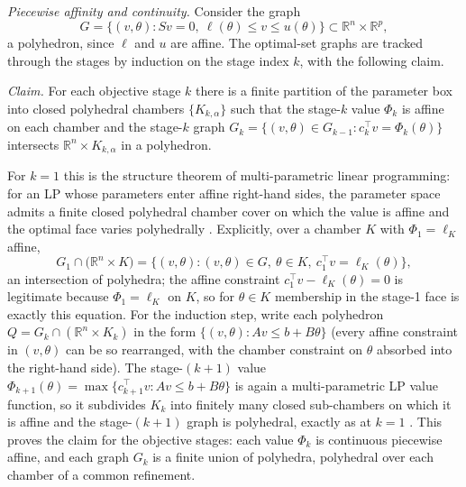 \documentclass[11pt,a4paper]{article}
\theoremstyle{plain}
\theoremstyle{definition}
\theoremstyle{remark}
\newcommand{\RR}{\mathbb{R}}
\begin{document}
\emph{Piecewise affinity and continuity.} Consider the graph
\[
G = \bigl\{(v, \theta) : Sv = 0,\ \ell(\theta) \le v \le u(\theta)
\bigr\} \subset \RR^{n} \times \RR^{p},
\]
a polyhedron, since $\ell$ and $u$ are affine. The optimal-set
graphs are tracked through the stages by induction on the stage
index $k$, with the following claim.

\emph{Claim.} For each objective stage $k$ there is a finite
partition of the parameter box into closed polyhedral chambers
$\{K_{k,\alpha}\}$ such that the stage-$k$ value $\Phi_k$ is affine
on each chamber and the stage-$k$ graph $G_k = \{(v,\theta) \in
G_{k-1} : c_k^{\top}v = \Phi_k(\theta)\}$ intersects
$\RR^{n} \times K_{k,\alpha}$ in a polyhedron.

For $k = 1$ this is the structure theorem of multi-parametric
linear programming: for an LP whose parameters enter affine
right-hand sides, the parameter space admits a finite closed
polyhedral chamber cover on which the value is affine and the
optimal face varies polyhedrally \citep{borrelli2003}. Explicitly,
over a chamber $K$ with $\Phi_1 = \ell_K$ affine,
\[
G_1 \cap \bigl(\RR^{n} \times K\bigr)
= \bigl\{(v,\theta) : (v,\theta) \in G,\ \theta \in K,\
c_1^{\top}v = \ell_K(\theta)\bigr\},
\]
an intersection of polyhedra; the affine constraint
$c_1^{\top}v - \ell_K(\theta) = 0$ is legitimate because
$\Phi_1 = \ell_K$ on $K$, so for $\theta \in K$ membership in the
stage-1 face is exactly this equation. For the induction step,
write each polyhedron $Q = G_k \cap (\RR^{n} \times K_{k})$ in the
form $\{(v, \theta) : A v \le b + B\theta\}$ (every affine
constraint in $(v, \theta)$ can be so rearranged, with the chamber
constraint on $\theta$ absorbed into the right-hand side). The
stage-$(k{+}1)$ value $\Phi_{k+1}(\theta) = \max\{c_{k+1}^{\top}v :
Av \le b + B\theta\}$ is again a multi-parametric LP value function,
so it subdivides $K_{k}$ into finitely many closed sub-chambers on
which it is affine and the stage-$(k{+}1)$ graph is polyhedral,
exactly as at $k = 1$ \citep{borrelli2003}. This proves the claim
for the objective stages: each value $\Phi_k$ is continuous
piecewise affine, and each graph $G_k$ is a finite union of
polyhedra, polyhedral over each chamber of a common refinement.
\end{document}
